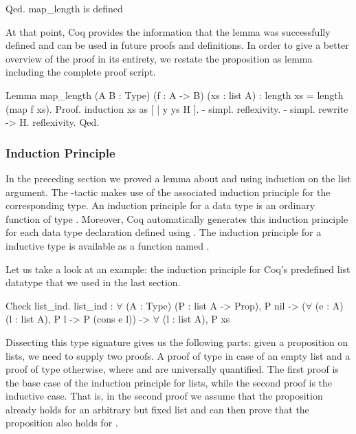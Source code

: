\begin{cproof}{Qed.}
  map_length is defined
\end{cproof}

At that point, Coq provides the information that the lemma  was successfully defined and can be used in future proofs and definitions.
In order to give a better overview of the proof in its entirety, we restate the proposition as lemma including the complete proof script.

\begin{coqcode}
Lemma map_length (A B : Type) (f : A -> B) (xs : list A)
  : length xs = length (map f xs).
Proof.
  induction xs as [ | y ys H ].
  - simpl. reflexivity.
  - simpl. rewrite -> H. reflexivity.
Qed.
\end{coqcode}

\subsubsection{Induction Principle}
\label{subsub:induction}

In the preceding section we proved a lemma about  and  using induction on the list argument.
The \--tactic makes use of the associated induction principle for the corresponding type.
An induction principle for a data type is an ordinary function of type .
Moreover, Coq automatically generates this induction principle for each data type declaration defined using .
The induction principle for a inductive type  is available as a function named .

Let us take a look at an example: the induction principle for Coq's predefined list datatype that we used in the last section.

\begin{crepl}
\coqrepl Check list_ind.
  list_ind : \(\forall\) (A : Type) (P : list A -> Prop),
    P nil ->
    (\(\forall\) (e : A) (l : list A), P l -> P (cons e l)) ->
    \(\forall\) (l : list A), P xs
\end{crepl}

Dissecting this type signature gives us the following parts: given a proposition  on lists, we need to supply two proofs.
A proof of type  in case of an empty list and a proof of type  otherwise, where  and  are universally quantified.
The first proof is the base case of the induction principle for lists, while the second proof is the inductive case.
That is, in the second proof we assume that the proposition already holds for an arbitrary but fixed list  and can then prove that the proposition also holds for .


